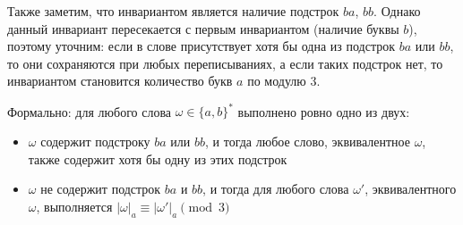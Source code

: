 \documentclass{article}
\begin{document}
Также заметим, что инвариантом является наличие подстрок $ba$, $bb$. Однако данный инвариант пересекается с первым инвариантом (наличие буквы $b$), поэтому уточним: если в слове присутствует хотя бы одна из подстрок $ba$ или $bb$, то они сохраняются при любых переписываниях, а если таких подстрок нет, то инвариантом становится количество букв $a$ по модулю 3.

Формально: для любого слова $\omega \in \{a,b\}^*$ выполнено ровно одно из двух:
\begin{itemize}
    \item $\omega$ содержит подстроку $ba$ или $bb$, и тогда любое слово, эквивалентное $\omega$, также содержит хотя бы одну из этих подстрок
    \item $\omega$ не содержит подстрок $ba$ и $bb$, и тогда для любого слова $\omega'$, эквивалентного $\omega$, выполняется $|\omega|_a \equiv |\omega'|_a \pmod{3}$
\end{itemize}
\end{document}
